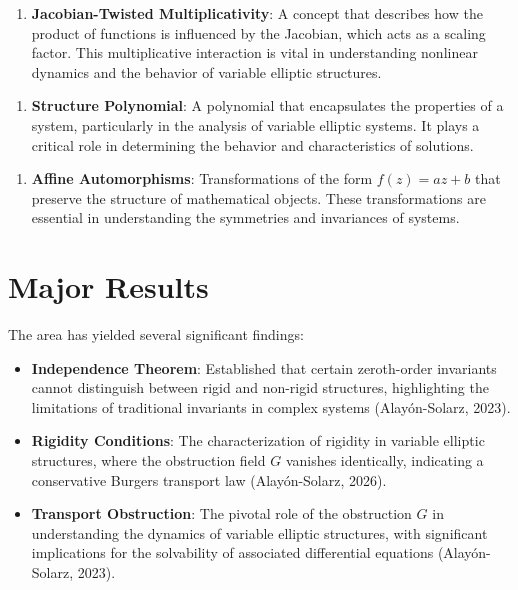 \documentclass[11pt,a4paper]{article}
\begin{document}
\begin{enumerate}
\item \textbf{Jacobian-Twisted Multiplicativity}: A concept that describes how the product of functions is influenced by the Jacobian, which acts as a scaling factor. This multiplicative interaction is vital in understanding nonlinear dynamics and the behavior of variable elliptic structures.
\end{enumerate}

\begin{enumerate}
\item \textbf{Structure Polynomial}: A polynomial that encapsulates the properties of a system, particularly in the analysis of variable elliptic systems. It plays a critical role in determining the behavior and characteristics of solutions.
\end{enumerate}

\begin{enumerate}
\item \textbf{Affine Automorphisms}: Transformations of the form \( f(z) = az + b \) that preserve the structure of mathematical objects. These transformations are essential in understanding the symmetries and invariances of systems.
\end{enumerate}

\section{Major Results}

The area has yielded several significant findings:

\begin{itemize}
\item \textbf{Independence Theorem}: Established that certain zeroth-order invariants cannot distinguish between rigid and non-rigid structures, highlighting the limitations of traditional invariants in complex systems (Alayón-Solarz, 2023).
\end{itemize}

\begin{itemize}
\item \textbf{Rigidity Conditions}: The characterization of rigidity in variable elliptic structures, where the obstruction field \( G \) vanishes identically, indicating a conservative Burgers transport law (Alayón-Solarz, 2026).
\end{itemize}

\begin{itemize}
\item \textbf{Transport Obstruction}: The pivotal role of the obstruction \( G \) in understanding the dynamics of variable elliptic structures, with significant implications for the solvability of associated differential equations (Alayón-Solarz, 2023).
\end{itemize}
\end{document}
